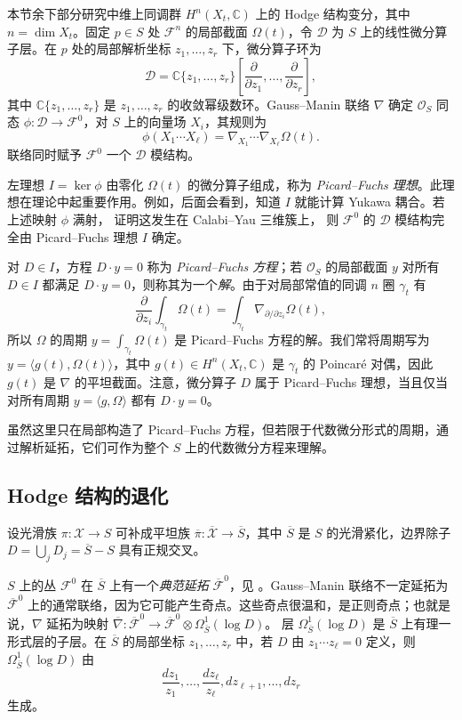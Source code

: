 本节余下部分研究中维上同调群 $H^n(X_t,\mathbb C)$ 上的 Hodge 结构变分，其中 $n=\dim X_t$。固定 $p\in S$ 处 $\mathcal F^n$ 的局部截面 $\Omega(t)$，令 $\mathcal D$ 为 $S$ 上的线性微分算子层。在 $p$ 处的局部解析坐标 $z_1,\ldots,z_r$ 下，微分算子环为
\[
\mathcal D=\mathbb C\{z_1,\ldots,z_r\}
\left[\frac\partial{\partial z_1},\ldots,
\frac\partial{\partial z_r}\right],
\]
其中 $\mathbb C\{z_1,\ldots,z_r\}$ 是 $z_1,\ldots,z_r$ 的收敛幂级数环。Gauss--Manin 联络 $\nabla$ 确定 $\mathcal O_S$ 同态 $\phi:\mathcal D\to\mathcal F^0$，对 $S$ 上的向量场 $X_i$，其规则为
\[
\phi(X_1\cdots X_\ell)
=\nabla_{X_1}\cdots\nabla_{X_\ell}\Omega(t).
\]
联络同时赋予 $\mathcal F^0$ 一个 $\mathcal D$ 模结构。

左理想 $I=\ker\phi$ 由零化 $\Omega(t)$ 的微分算子组成，称为 \emph{Picard--Fuchs 理想}。此理想在理论中起重要作用。例如，后面会看到，知道 $I$ 就能计算 Yukawa 耦合。若上述映射 $\phi$ 满射， 证明这发生在 Calabi--Yau 三维簇上，
则 $\mathcal F^0$ 的 $\mathcal D$ 模结构完全由 Picard--Fuchs 理想 $I$ 确定。

对 $D\in I$，方程 $D\cdot y=0$ 称为 \emph{Picard--Fuchs 方程}；若 $\mathcal O_S$ 的局部截面 $y$ 对所有 $D\in I$ 都满足 $D\cdot y=0$，则称其为一个\emph{解}。由于对局部常值的同调 $n$ 圈 $\gamma_t$ 有
\begin{equation}\label{eq:period-derivative}
\frac\partial{\partial z_i}\int_{\gamma_t}\Omega(t)
=\int_{\gamma_t}\nabla_{\partial/\partial z_i}\Omega(t),
\end{equation}
所以 $\Omega$ 的周期 $y=\int_{\gamma_t}\Omega(t)$ 是 Picard--Fuchs 方程的解。我们常将周期写为 $y=\langle g(t),\Omega(t)\rangle$，其中 $g(t)\in H^n(X_t,\mathbb C)$ 是 $\gamma_t$ 的 Poincaré 对偶，因此 $g(t)$ 是 $\nabla$ 的平坦截面。注意，微分算子 $D$ 属于 Picard--Fuchs 理想，当且仅当对所有周期 $y=\langle g,\Omega\rangle$ 都有 $D\cdot y=0$。

虽然这里只在局部构造了 Picard--Fuchs 方程，但若限于代数微分形式的周期，通过解析延拓，它们可作为整个 $S$ 上的代数微分方程来理解。

\subsection{Hodge 结构的退化}\label{subsec:hodge-degenerations}

设光滑族 $\pi:\mathcal X\to S$ 可补成平坦族 $\overline\pi:\overline{\mathcal X}\to\overline S$，其中 $\overline S$ 是 $S$ 的光滑紧化，边界除子 $D=\bigcup_j D_j=\overline S-S$ 具有正规交叉。

$S$ 上的丛 $\mathcal F^0$ 在 $\overline S$ 上有一个\emph{典范延拓} $\overline{\mathcal F}^0$，见 。Gauss--Manin 联络不一定延拓为 $\overline{\mathcal F}^0$ 上的通常联络，因为它可能产生奇点。这些奇点很温和，是正则奇点；也就是说，$\nabla$ 延拓为映射
$\overline\nabla:\overline{\mathcal F}^0\to\overline{\mathcal F}^0\otimes\Omega_{\overline S}^1(\log D)$。
层 $\Omega_{\overline S}^1(\log D)$ 是 $\overline S$ 上有理一形式层的子层。在 $\overline S$ 的局部坐标 $z_1,\ldots,z_r$ 中，若 $D$ 由 $z_1\cdots z_\ell=0$ 定义，则 $\Omega_{\overline S}^1(\log D)$ 由
\[
\frac{dz_1}{z_1},\ldots,\frac{dz_\ell}{z_\ell},
dz_{\ell+1},\ldots,dz_r
\]
生成。

